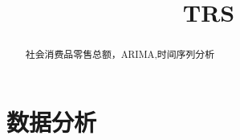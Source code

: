 \documentclass[12pt,a4paper]{nmmcm}
\title{TRS}
\date{}
\begin{document}
\begin{abstract}


\begin{keywords}
{\song\xiaosihao
社会消费品零售总额，ARIMA,时间序列分析}
\end{keywords}


\end{abstract}
\maketitle
\renewcommand{\contentsname}{\centerline{\sanhao\bfseries\HEI 目\quad 录}}
\tableofcontents

\newpage
\setcounter{page}{1}
\pagestyle{fancy}
\song\xiaosihao
\section{数据分析}
\end{document}
